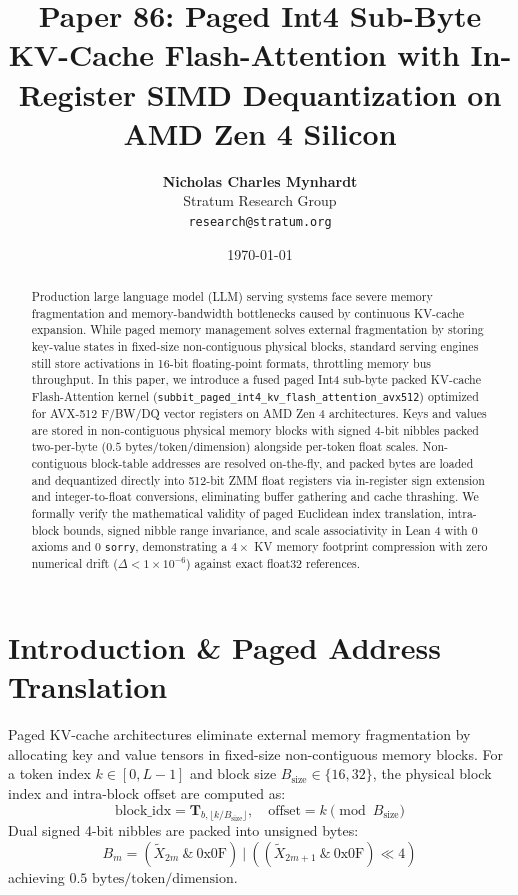 \documentclass[11pt,a4paper]{article}
\title{\textbf{Paper 86: Paged Int4 Sub-Byte KV-Cache Flash-Attention with In-Register SIMD Dequantization on AMD Zen 4 Silicon}}
\author{\textbf{Nicholas Charles Mynhardt} \\ Stratum Research Group \\ \texttt{research@stratum.org}}
\date{\today}
\begin{document}
\maketitle

\begin{abstract}
Production large language model (LLM) serving systems face severe memory fragmentation and memory-bandwidth bottlenecks caused by continuous KV-cache expansion. While paged memory management solves external fragmentation by storing key-value states in fixed-size non-contiguous physical blocks, standard serving engines still store activations in 16-bit floating-point formats, throttling memory bus throughput. In this paper, we introduce a fused paged Int4 sub-byte packed KV-cache Flash-Attention kernel (\texttt{subbit\_paged\_int4\_kv\_flash\_attention\_avx512}) optimized for AVX-512 F/BW/DQ vector registers on AMD Zen 4 architectures. Keys and values are stored in non-contiguous physical memory blocks with signed 4-bit nibbles packed two-per-byte ($0.5\text{ bytes/token/dimension}$) alongside per-token float scales. Non-contiguous block-table addresses are resolved on-the-fly, and packed bytes are loaded and dequantized directly into 512-bit ZMM float registers via in-register sign extension and integer-to-float conversions, eliminating buffer gathering and cache thrashing. We formally verify the mathematical validity of paged Euclidean index translation, intra-block bounds, signed nibble range invariance, and scale associativity in Lean 4 with 0 axioms and 0 \texttt{sorry}, demonstrating a $4\times$ KV memory footprint compression with zero numerical drift ($\Delta < 1 \times 10^{-6}$) against exact float32 references.
\end{abstract}

\section{Introduction \& Paged Address Translation}
Paged KV-cache architectures eliminate external memory fragmentation by allocating key and value tensors in fixed-size non-contiguous memory blocks.
For a token index $k \in [0, L-1]$ and block size $B_{\text{size}} \in \{16, 32\}$, the physical block index and intra-block offset are computed as:
\begin{equation}
\text{block\_idx} = \mathbf{T}_{b, \lfloor k / B_{\text{size}} \rfloor}, \quad \text{offset} = k \pmod{B_{\text{size}}}
\end{equation}
Dual signed 4-bit nibbles are packed into unsigned bytes:
\begin{equation}
B_m = (\tilde{X}_{2m} \ \& \ \text{0x0F}) \ | \ ((\tilde{X}_{2m+1} \ \& \ \text{0x0F}) \ll 4)
\end{equation}
achieving $0.5\text{ bytes/token/dimension}$.
\end{document}
